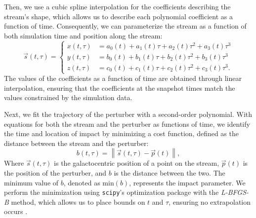 \documentclass{aa}
\begin{document}
\begin{appendix}
      Then, we use a cubic spline interpolation for the coefficients describing the stream's shape, which allows us to describe each polynomial coefficient as a function of time. Consequently, we can parameterize the stream as a function of both simulation time and position along the stream:
      \begin{equation}
        \vec{s}(t,\tau) = 
        \left\{
        \begin{aligned}
          x(t,\tau) &= a_0(t) + a_1(t)\tau + a_2(t) \tau^2 + a_3(t)\tau^3 \\ 
          y(t,\tau) &= b_0(t) + b_1(t)\tau + b_2(t) \tau^2 + b_3(t)\tau^3 \\
          z(t,\tau) &= c_0(t) + c_1(t)\tau + c_2(t) \tau^2 + c_3(t)\tau^3.
          \end{aligned}
        \right.
      \end{equation}
      The values of the coefficients as a function of time are obtained through linear interpolation, ensuring that the coefficients at the snapshot times match the values constrained by the simulation data.

      Next, we fit the trajectory of the perturber with a second-order polynomial. With equations for both the stream and the perturber as functions of time, we identify the time and location of impact by minimizing a cost function, defined as the distance between the stream and the perturber:
      \begin{equation} 
        b(t, \tau) = \left\lVert \vec{s}(t, \tau) - \vec{p}(t) \right\rVert, 
        \end{equation}
      Where $\vec{s}(t, \tau)$ is the galactocentric position of a point on the stream, $\vec{p}(t)$ is the position of the perturber, and $b$ is the distance between the two. The minimum value of $b$, denoted as $\text{min}(b)$, represents the impact parameter. We perform the minimization using \texttt{scipy}'s optimization package with the \textit{L-BFGS-B} method, which allows us to place bounds on $t$ and $\tau$, ensuring no extrapolation occurs \citep{davidon1991variable}.


\end{appendix}
\end{document}
